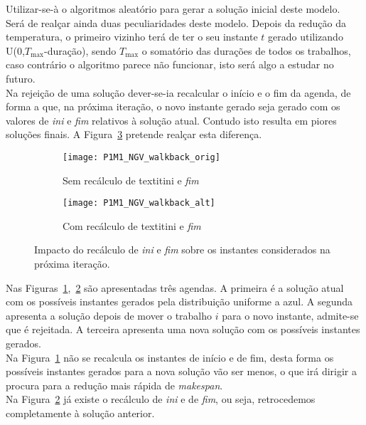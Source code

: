 Utilizar-se-à o algoritmos aleatório para gerar a solução inicial deste modelo.\\

Será de realçar ainda duas peculiaridades deste modelo. Depois da redução da temperatura, o primeiro vizinho terá de ter o seu instante $t$ gerado utilizando U(0,$T_{\max}$-duração), sendo $T_{\max}$ o somatório das durações de todos os trabalhos, caso contrário o algoritmo parece não funcionar, isto será algo a estudar no futuro.\\
Na rejeição de uma solução dever-se-ia recalcular o início e o fim da agenda, de forma a que, na próxima iteração, o novo instante gerado seja gerado com os valores de \textit{ini} e \textit{fim} relativos à solução atual. Contudo isto resulta em piores soluções finais. A Figura~\ref{fig:P1M1_NGV_walkback} pretende realçar esta diferença.\\
\begin{figure}[H]
	\centering
	\begin{subfigure}{0.49\textwidth}
	\centering
		\texttt{[image: P1M1\_NGV\_walkback\_orig]}
		\caption{Sem recálculo de textit{ini} e \textit{fim}}
		\label{fig:P1M1_NGV_walkback_orig}
	\end{subfigure}
	\begin{subfigure}{0.49\textwidth}
	\centering
		\texttt{[image: P1M1\_NGV\_walkback\_alt]}
		\caption{Com recálculo de textit{ini} e \textit{fim}}
		\label{fig:P1M1_NGV_walkback_alt}
	\end{subfigure}
	\caption{Impacto do recálculo de \textit{ini} e \textit{fim} sobre os instantes considerados na próxima iteração.}
	\label{fig:P1M1_NGV_walkback}
\end{figure}

Nas Figuras~\ref{fig:P1M1_NGV_walkback_orig},~\ref{fig:P1M1_NGV_walkback_alt} são apresentadas três agendas. A primeira é a solução atual com os possíveis instantes gerados pela distribuição uniforme a azul. A segunda apresenta a solução depois de mover o trabalho $i$ para o novo instante, admite-se que é rejeitada. A terceira apresenta uma nova solução com os possíveis instantes gerados.\\
Na Figura~\ref{fig:P1M1_NGV_walkback_orig} não se recalcula os instantes de início e de fim, desta forma os possíveis instantes gerados para a nova solução vão ser menos, o que irá dirigir a procura para a redução mais rápida de \textit{makespan}.\\
Na Figura~\ref{fig:P1M1_NGV_walkback_alt} já existe o recálculo de \textit{ini} e de \textit{fim}, ou seja, retrocedemos completamente à solução anterior.\\


